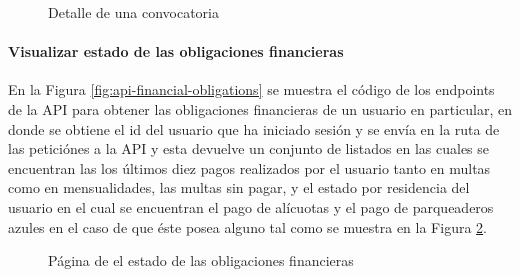 \begin{figure}[H]
    \centering
    \caption{Detalle de una convocatoria}
    \label{fig:app-eventos-detalle}
\end{figure}

\paragraph{Visualizar estado de las obligaciones financieras}

En la Figura \ref{fig:api-financial-obligations} se muestra el código de los endpoints de la API para obtener las obligaciones financieras de un usuario en particular, en donde se obtiene el id del usuario que ha iniciado sesión y se envía en la ruta de las peticiónes a la API y esta devuelve un conjunto de listados en las cuales se encuentran las los últimos diez pagos realizados por el usuario tanto en multas como en mensualidades, las multas sin pagar, y el estado por residencia del usuario en el cual se encuentran el pago de alícuotas y el pago de parqueaderos azules en el caso de que éste posea alguno tal como se muestra en la Figura \ref{fig:app-financial-obligations}.

\begin{figure}[H]
    \centering
    \caption{Página de el estado de las obligaciones financieras}
    \label{fig:app-financial-obligations}
\end{figure}


